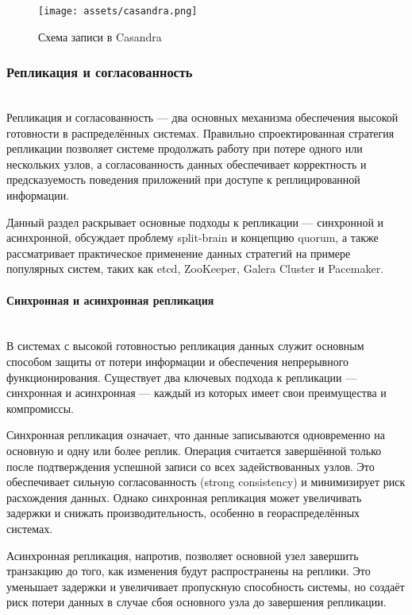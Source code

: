 \begin{figure}[h]
    \centering
    \texttt{[image: assets/casandra.png]}
    \caption{Схема записи в Casandra}
    \label{fig:mesh2}
\end{figure}


\subsubsection{Репликация и согласованность} ~\\

Репликация и согласованность — два основных механизма обеспечения высокой готовности в распределённых системах. Правильно спроектированная стратегия репликации позволяет системе продолжать работу при потере одного или нескольких узлов, а согласованность данных обеспечивает корректность и предсказуемость поведения приложений при доступе к реплицированной информации. \autocite{Kleppmann}

Данный раздел раскрывает основные подходы к репликации — синхронной и асинхронной, обсуждает проблему split-brain и концепцию quorum, а также рассматривает практическое применение данных стратегий на примере популярных систем, таких как etcd, ZooKeeper, Galera Cluster и Pacemaker.

\paragraph{Синхронная и асинхронная репликация} ~\\

В системах с высокой готовностью репликация данных служит основным способом защиты от потери информации и обеспечения непрерывного функционирования. Существует два ключевых подхода к репликации — синхронная и асинхронная — каждый из которых имеет свои преимущества и компромиссы. \autocite{Kleppmann}

Синхронная репликация означает, что данные записываются одновременно на основную и одну или более реплик. Операция считается завершённой только после подтверждения успешной записи со всех задействованных узлов. Это обеспечивает сильную согласованность (strong consistency) и минимизирует риск расхождения данных. Однако синхронная репликация может увеличивать задержки и снижать производительность, особенно в геораспределённых системах.

Асинхронная репликация, напротив, позволяет основной узел завершить транзакцию до того, как изменения будут распространены на реплики. Это уменьшает задержки и увеличивает пропускную способность системы, но создаёт риск потери данных в случае сбоя основного узла до завершения репликации.

